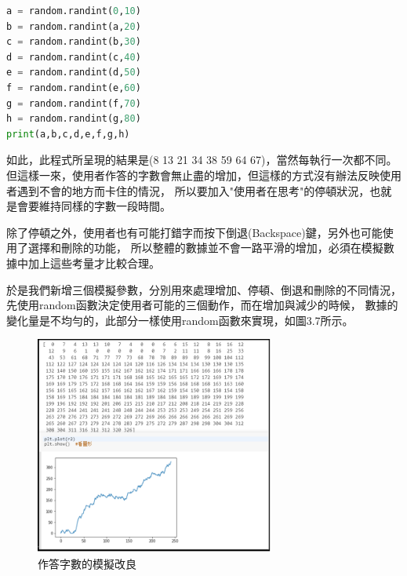 \begin{lstlisting}[language=Python,caption=作答字數的模擬數據]
a = random.randint(0,10)
b = random.randint(a,20)
c = random.randint(b,30)
d = random.randint(c,40)
e = random.randint(d,50)
f = random.randint(e,60)
g = random.randint(f,70)
h = random.randint(g,80)
print(a,b,c,d,e,f,g,h)
\end{lstlisting}

如此，此程式所呈現的結果是(8 13 21 34 38 59 64 67)，當然每執行一次都不同。
但這樣一來，使用者作答的字數會無止盡的增加，但這樣的方式沒有辦法反映使用者遇到不會的地方而卡住的情況，
所以要加入"使用者在思考"的停頓狀況，也就是會要維持同樣的字數一段時間。

除了停頓之外，使用者也有可能打錯字而按下倒退(Backspace)鍵，另外也可能使用了選擇和刪除的功能，
所以整體的數據並不會一路平滑的增加，必須在模擬數據中加上這些考量才比較合理。

於是我們新增三個模擬參數，分別用來處理增加、停頓、倒退和刪除的不同情況，
先使用random函數決定使用者可能的三個動作，而在增加與減少的時候，
數據的變化量是不均勻的，此部分一樣使用random函數來實現，如圖3.7所示。
\begin{figure}[H] %
	\centering %
	\includegraphics[width=0.7\textwidth]{3_2_1_4.png} %
	\caption{作答字數的模擬改良} %
	\label{Fig.3.7} %
\end{figure}

